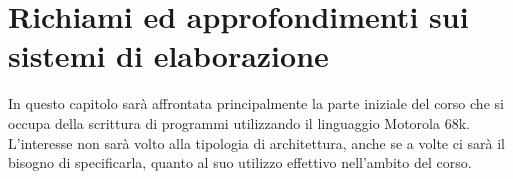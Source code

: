 \chapter{Richiami ed approfondimenti sui sistemi di
elaborazione}
In questo capitolo sarà affrontata principalmente la parte iniziale del corso che si occupa della scrittura di programmi utilizzando il linguaggio Motorola 68k. L'interesse non sarà volto alla tipologia di architettura, anche se a volte ci sarà il bisogno di specificarla, quanto al suo utilizzo effettivo nell'ambito del corso.


\clearpage

\clearpage